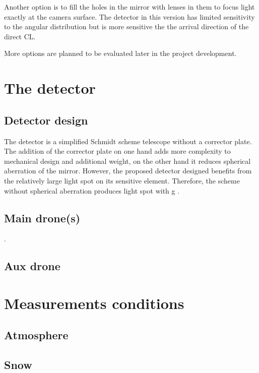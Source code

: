 \documentclass[a4paper,11pt]{article}
\begin{document}
Another option is to fill the holes in the mirror with lenses in them to focus light exactly at the camera surface. The detector in this version has limited sensitivity to the angular distribution but is more sensitive the the arrival direction of the direct CL.

More options are planned to be evaluated later in the project development.

\section{The detector}
\subsection{Detector design}
The detector is a simplified Schmidt scheme telescope without a corrector plate. The addition of the corrector plate on one hand adds more complexity to mechanical design and additional weight, on the other hand it reduces spherical aberration of the mirror. However, the proposed detector designed benefits from the relatively large light spot on its sensitive element. Therefore, the scheme without 
spherical aberration produces light spot with g
.
\subsection{Main drone(s)}
.
\subsection{Aux drone}

\section{Measurements conditions}
\subsection{Atmosphere}
\subsection{Snow}
\end{document}
